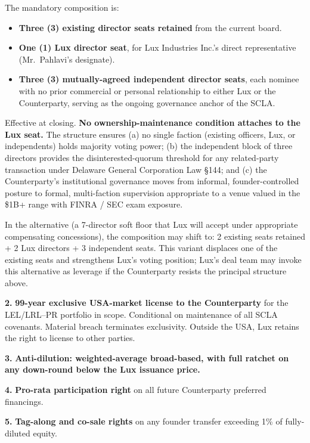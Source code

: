 \documentclass[11pt,letterpaper]{article}
\begin{document}
The mandatory composition is:

\begin{itemize}[leftmargin=2em,itemsep=0.1em]
\item \textbf{Three (3) existing director seats retained} from the
current board.
\item \textbf{One (1) Lux director seat}, for Lux Industries Inc.'s
direct representative (Mr.\ Pahlavi's designate).
\item \textbf{Three (3) mutually-agreed independent director seats},
each nominee with no prior commercial or personal relationship to
either Lux or the Counterparty, serving as the ongoing governance
anchor of the SCLA.
\end{itemize}

Effective at closing. \textbf{No ownership-maintenance condition
attaches to the Lux seat.} The structure ensures (a) no single
faction (existing officers, Lux, or independents) holds majority
voting power; (b) the independent block of three directors provides
the disinterested-quorum threshold for any related-party transaction
under Delaware General Corporation Law \S 144; and (c) the
Counterparty's institutional governance moves from informal,
founder-controlled posture to formal, multi-faction supervision
appropriate to a venue valued in the \$1B+ range with FINRA / SEC
exam exposure.

In the alternative (a 7-director soft floor that Lux will accept
under appropriate compensating concessions), the composition may
shift to: 2 existing seats retained + 2 Lux directors + 3 independent
seats. This variant displaces one of the existing seats and
strengthens Lux's voting position; Lux's deal team may invoke this
alternative as leverage if the Counterparty resists the principal
structure above.

\textbf{2.} \textbf{99-year exclusive USA-market license to the
Counterparty} for the LEL/LRL--PR portfolio in scope. Conditional on
maintenance of all SCLA covenants. Material breach terminates
exclusivity. Outside the USA, Lux retains the right to license to
other parties.

\textbf{3.} \textbf{Anti-dilution: weighted-average broad-based,
with full ratchet on any down-round below the Lux issuance price.}

\textbf{4.} \textbf{Pro-rata participation right} on all future
Counterparty preferred financings.

\textbf{5.} \textbf{Tag-along and co-sale rights} on any founder
transfer exceeding 1\% of fully-diluted equity.
\end{document}
